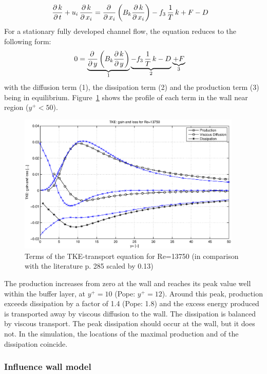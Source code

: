 \begin{align}
\frac{\partial\,k}{\partial\,t} + u_i\,\frac{\partial\,k}{\partial\,x_i}
&=
\frac{\partial\,}{\partial\,x_i}\left(  B_k \frac{\partial\,k}{\partial\,x_i} \right) 
-
f_3\,\frac{1}{T} \, k
+
F
-
D
\end{align}
For a stationary fully developed channel flow, the equation reduces to the following form:
\begin{align}
0
&=
\underbrace{
\frac{\partial\,}{\partial\,y}\left(  B_k \frac{\partial\,k}{\partial\,y} \right) 
}_{1}
\underbrace{
-
f_3\,\frac{1}{T} \, k
-
D
}_{2}
\underbrace{+
F}_3
\end{align}
with the diffusion term (1), the dissipation term (2) and the production term (3) being in equilibrium. Figure~\ref{fig:pop_tke} shows the profile of each term in the wall near region ($y^+<50$).
\begin{figure}[!htb]
\centering
\includegraphics[trim=60 20 60 15,clip,width=0.95\textwidth]{FIGURES/tkegainloss.eps}
\caption{Terms of the TKE-transport equation for Re=13750 (in comparison with the literature \citep{pope2000} p. 285 scaled by 0.13)}
\label{fig:pop_tke}
\end{figure} 

\noii The production increases from zero at the wall and reaches its peak value well within the buffer layer, at $y^+=10$ (Pope: $y^+=12$). Around this peak, production exceeds dissipation by a factor of 1.4 (Pope: 1.8) and the excess energy produced is transported away by viscous diffusion to the wall. The dissipation is balanced by viscous transport. The peak dissipation should occur at the wall, but it does not. In the simulation, the locations of the maximal production and of the dissipation coincide.


\subsubsection*{Influence wall model}

